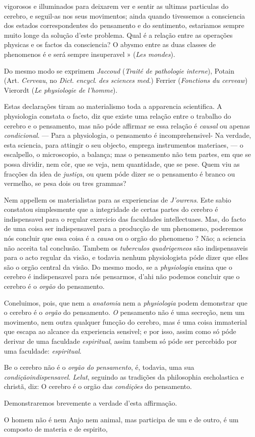 vigorosos e illuminados para deixarem ver e sentir as ultimas particulas do cerebro, e seguil-as nos seus movimentos; ainda quando tivessemos a consciencia dos estados correspondentes do pensamento e do sentimento, estariamos sempre muito longe da solução d'este problema. Qual é a relação entre as operações physicas e os factos da consciencia? O abysmo entre as duas classes de phenomenos é e será sempre insuperavel » (\emph{Les mondes}).\par Do mesmo modo se exprimem \emph{Jaccoud} (\emph{Traité de pathologie interne}), Potain (Art. \emph{Cerveau}, no \emph{Dict}. \emph{encycl}. \emph{des sciences med}.) Ferrier (\emph{Fonctions du cerveaw}) Vierordt (\emph{Le physiologie de l'homme}).\par Estas declarações tiram ao materialismo toda a apparencia scientifica. A physiologia constata o facto, diz que existe uma relação entre o trabalho do cerebro e o pensamento, mas não póde affirmar se essa relação é \emph{causal} ou apenas \emph{condicional}. --- Para a physiologia, o pensamento é incomprehensivel- Na verdade, esta sciencia, para attingir o seu objecto, emprega instrumentos materiaes, --- o escalpello, o microscopio, a balança; mas o pensamento não tem partes, em que se possa dividir, nem côr, que se veja, nem quantidade, que se pese. Quem viu as fracções da idea de \emph{justiça}, ou quem póde dizer se o pensamento é branco ou vermelho, se pesa dois ou tres grammas?\par Nem appellem os materialistas para as experiencias de \emph{J'owrens}. Este sabio constatou simplesmente que a integridade de certas partes do cerebro é indispensavel para o regular exercicio das faculdades intellectuaes. Mas, do facto de uma coisa ser indispensavel para a producção de um phenomeno, poderemos nós concluir que essa coisa é a \emph{causa} ou o orgão do phenomeno ? Não; a sciencia não acceita tal conclusão. Tambem os \emph{tuberculos quadrigemeos} são indispensaveis para o acto regular da visão, e todavia nenhum physiologista póde dizer que elles são o orgão central da visão. Do mesmo modo, se a \emph{physiologia} ensina que o cerebro é indispensavel para nós pensarmos, d'ahi não podemos concluir que o cerebro é o \emph{orgão} do pensamento.\par Coneluimos, pois, que nem a \emph{anatomia} nem a \emph{physiologia} podem demonstrar que o cerebro é o \emph{orgão} do pensamento. \emph{O} pensamento não é uma secreção, nem um movimento, nem outra qualquer funcção do cerebro, mas é uma coisa immaterial que escapa ao alcance da experiencia sensivel; e por isso, assim como só póde derivar de uma faculdade \emph{espiritual}, assim tambem só póde ser percebido por uma faculdade: \emph{espiritual}.\par Be o cerebro não é o \emph{orgão do pensamento}, é, todavia, uma sua \emph{condição}\emph{indispensavel}. \emph{Lelut}, seguindo as tradições da philosophia escholastica e christã, diz: O cerebro é o orgão das \emph{condições} do pensamento.\par Demonstraremos brevemente a verdade d'esta affirmação.\par O homem não é nem Anjo nem animal, mas participa de um e de outro, é um composto de materia e de espirito, 